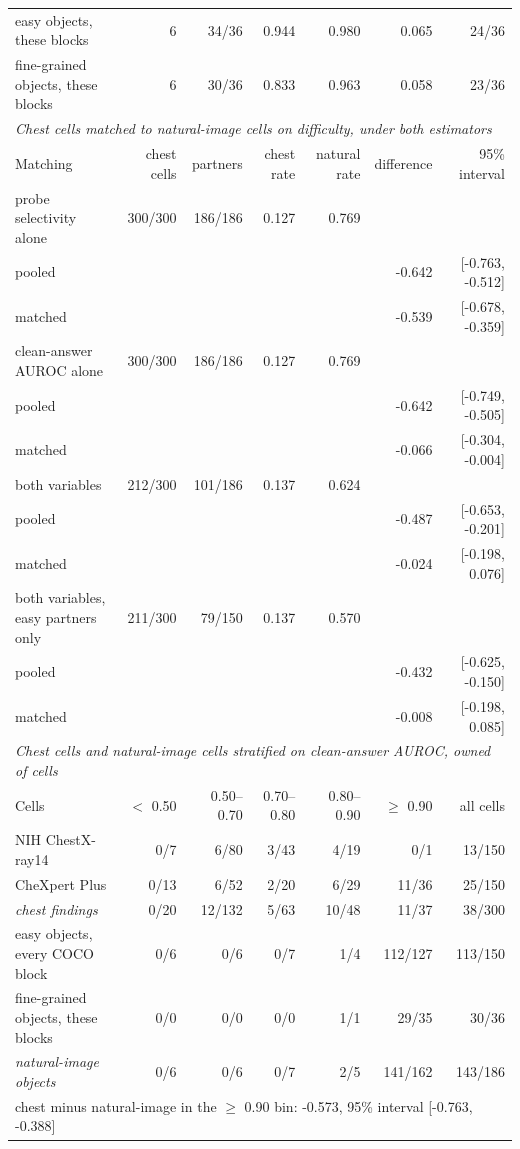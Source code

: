 \documentclass{article}
\begin{document}
\begin{table}[htbp]
{{{\begin{tabular}{lrrrrrr}
easy objects, these blocks & 6 & 34/36 & 0.944 & 0.980 & 0.065 & 24/36 \\
fine-grained objects, these blocks & 6 & 30/36 & 0.833 & 0.963 & 0.058 & 23/36 \\
\midrule
\multicolumn{7}{l}{\textit{Chest cells matched to natural-image cells on difficulty, under both estimators}} \\
Matching & chest cells & partners & chest rate & natural rate & difference & 95\% interval \\
\midrule
probe selectivity alone & 300/300 & 186/186 & 0.127 & 0.769 &  &  \\
\quad pooled &  &  &  &  & -0.642 & [-0.763, -0.512] \\
\quad matched &  &  &  &  & -0.539 & [-0.678, -0.359] \\
clean-answer AUROC alone & 300/300 & 186/186 & 0.127 & 0.769 &  &  \\
\quad pooled &  &  &  &  & -0.642 & [-0.749, -0.505] \\
\quad matched &  &  &  &  & -0.066 & [-0.304, -0.004] \\
both variables & 212/300 & 101/186 & 0.137 & 0.624 &  &  \\
\quad pooled &  &  &  &  & -0.487 & [-0.653, -0.201] \\
\quad matched &  &  &  &  & -0.024 & [-0.198, 0.076] \\
both variables, easy partners only & 211/300 & 79/150 & 0.137 & 0.570 &  &  \\
\quad pooled &  &  &  &  & -0.432 & [-0.625, -0.150] \\
\quad matched &  &  &  &  & -0.008 & [-0.198, 0.085] \\
\midrule
\multicolumn{7}{l}{\textit{Chest cells and natural-image cells stratified on clean-answer AUROC, owned of cells}} \\
Cells & $<$ 0.50 & 0.50--0.70 & 0.70--0.80 & 0.80--0.90 & $\geq$ 0.90 & all cells \\
\midrule
NIH ChestX-ray14 & 0/7 & 6/80 & 3/43 & 4/19 & 0/1 & 13/150 \\
CheXpert Plus & 0/13 & 6/52 & 2/20 & 6/29 & 11/36 & 25/150 \\
\textit{chest findings} & 0/20 & 12/132 & 5/63 & 10/48 & 11/37 & 38/300 \\
easy objects, every COCO block & 0/6 & 0/6 & 0/7 & 1/4 & 112/127 & 113/150 \\
fine-grained objects, these blocks & 0/0 & 0/0 & 0/0 & 1/1 & 29/35 & 30/36 \\
\textit{natural-image objects} & 0/6 & 0/6 & 0/7 & 2/5 & 141/162 & 143/186 \\
\multicolumn{7}{l}{\quad chest minus natural-image in the $\geq$ 0.90 bin: -0.573, 95\% interval [-0.763, -0.388]} \\
\bottomrule
\end{tabular}}}
}
\end{table}
\end{document}

